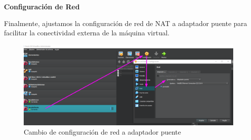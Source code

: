\textbf{Configuración de Red}\medskip


Finalmente, ajustamos la configuración de red de NAT a adaptador puente para facilitar la conectividad externa de la máquina virtual.

\begin{figure}[H]
    \centering
    \includegraphics[width=0.5\linewidth]{instalacionBacula/NatAdaptadorPuente.png}
    \caption{Cambio de configuración de red a adaptador puente}
\end{figure}

